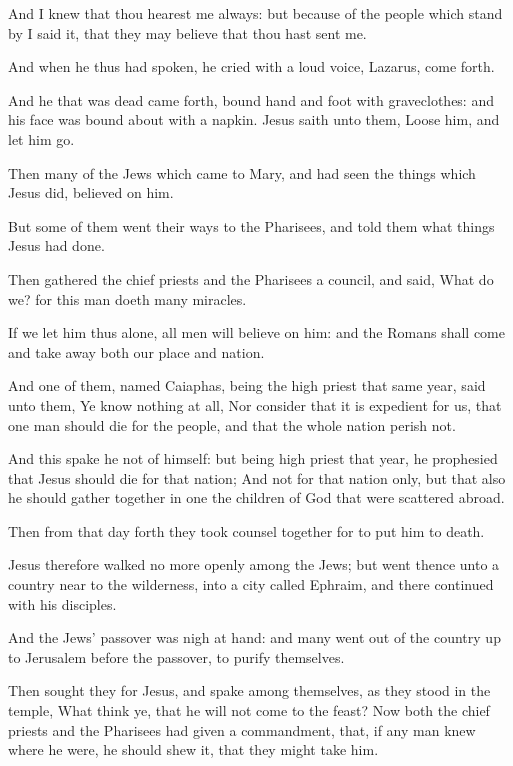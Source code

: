 \Verse And I knew that thou hearest me always: but because of the people which stand by I said it, that they may believe that thou hast sent me.

\Verse And when he thus had spoken, he cried with a loud voice, Lazarus, come forth.

\Verse And he that was dead came forth, bound hand and foot with graveclothes: and his face was bound about with a napkin. Jesus saith unto them, Loose him, and let him go.

\Verse Then many of the Jews which came to Mary, and had seen the things which Jesus did, believed on him.

\Verse But some of them went their ways to the Pharisees, and told them what things Jesus had done.

\Verse Then gathered the chief priests and the Pharisees a council, and said, What do we? for this man doeth many miracles.

\Verse If we let him thus alone, all men will believe on him: and the Romans shall come and take away both our place and nation.

\Verse And one of them, named Caiaphas, being the high priest that same year, said unto them, Ye know nothing at all, \Verse Nor consider that it is expedient for us, that one man should die for the people, and that the whole nation perish not.

\Verse And this spake he not of himself: but being high priest that year, he prophesied that Jesus should die for that nation; \Verse And not for that nation only, but that also he should gather together in one the children of God that were scattered abroad.

\Verse Then from that day forth they took counsel together for to put him to death.

\Verse Jesus therefore walked no more openly among the Jews; but went thence unto a country near to the wilderness, into a city called Ephraim, and there continued with his disciples.

\Verse And the Jews' passover was nigh at hand: and many went out of the country up to Jerusalem before the passover, to purify themselves.

\Verse Then sought they for Jesus, and spake among themselves, as they stood in the temple, What think ye, that he will not come to the feast?  \Verse Now both the chief priests and the Pharisees had given a commandment, that, if any man knew where he were, he should shew it, that they might take him.


